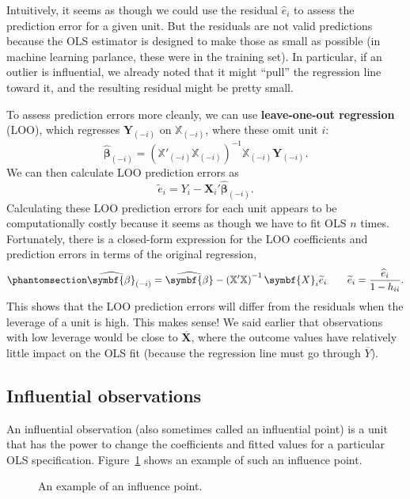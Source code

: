 \documentclass[
  13pt,
  letterpaper,
  DIV=11,
  numbers=noendperiod]{scrreprt}
\newcommand{\mb}{\symbf}
\newcommand{\X}{\mb{X}}
\newcommand{\Xmat}{\mathbb{X}}
\newcommand{\bhat}{\widehat{\mb{\beta}}}
\theoremstyle{plain}
\theoremstyle{definition}
\theoremstyle{definition}
\theoremstyle{remark}
\begin{document}
Intuitively, it seems as though we could use the residual
\(\widehat{e}_i\) to assess the prediction error for a given unit. But
the residuals are not valid predictions because the OLS estimator is
designed to make those as small as possible (in machine learning
parlance, these were in the training set). In particular, if an outlier
is influential, we already noted that it might ``pull'' the regression
line toward it, and the resulting residual might be pretty small.

To assess prediction errors more cleanly, we can use
\textbf{leave-one-out regression} (LOO), which regresses
\(\mb{Y}_{(-i)}\) on \(\Xmat_{(-i)}\), where these omit unit \(i\): \[ 
\bhat_{(-i)} = \left(\Xmat'_{(-i)}\Xmat_{(-i)}\right)^{-1}\Xmat_{(-i)}\mb{Y}_{(-i)}.
\] We can then calculate LOO prediction errors as \[ 
\widetilde{e}_{i} = Y_{i} - \X_{i}'\bhat_{(-i)}.
\] Calculating these LOO prediction errors for each unit appears to be
computationally costly because it seems as though we have to fit OLS
\(n\) times. Fortunately, there is a closed-form expression for the LOO
coefficients and prediction errors in terms of the original regression,
\begin{equation}\phantomsection\label{eq-loo-coefs}{ 
\bhat_{(-i)} = \bhat - \left( \Xmat'\Xmat\right)^{-1}\X_i\widetilde{e}_i \qquad \widetilde{e}_i = \frac{\widehat{e}_i}{1 - h_{ii}}.
}\end{equation} This shows that the LOO prediction errors will differ
from the residuals when the leverage of a unit is high. This makes
sense! We said earlier that observations with low leverage would be
close to \(\overline{\X}\), where the outcome values have relatively
little impact on the OLS fit (because the regression line must go
through \(\overline{Y}\)).

\subsection{Influential observations}\label{influential-observations}

An influential observation (also sometimes called an influential point)
is a unit that has the power to change the coefficients and fitted
values for a particular OLS specification. Figure~\ref{fig-influence}
shows an example of such an influence point.

\begin{figure}[th]


\caption{\label{fig-influence}An example of an influence point.}

\end{figure}%
\end{document}
